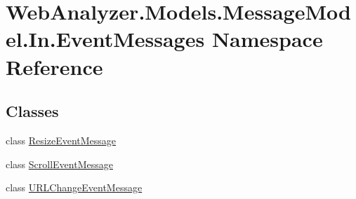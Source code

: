 \hypertarget{namespace_web_analyzer_1_1_models_1_1_message_model_1_1_in_1_1_event_messages}{}\section{Web\+Analyzer.\+Models.\+Message\+Model.\+In.\+Event\+Messages Namespace Reference}
\label{namespace_web_analyzer_1_1_models_1_1_message_model_1_1_in_1_1_event_messages}
\subsection*{Classes}
\begin{DoxyCompactItemize}
\item 
class \hyperlink{class_web_analyzer_1_1_models_1_1_message_model_1_1_in_1_1_event_messages_1_1_resize_event_message}{Resize\+Event\+Message}
\item 
class \hyperlink{class_web_analyzer_1_1_models_1_1_message_model_1_1_in_1_1_event_messages_1_1_scroll_event_message}{Scroll\+Event\+Message}
\item 
class \hyperlink{class_web_analyzer_1_1_models_1_1_message_model_1_1_in_1_1_event_messages_1_1_u_r_l_change_event_message}{U\+R\+L\+Change\+Event\+Message}
\end{DoxyCompactItemize}
